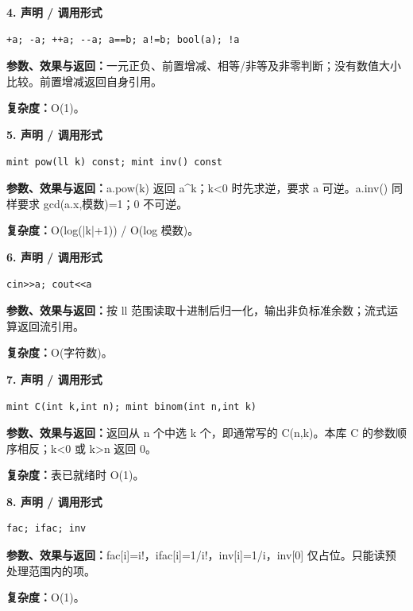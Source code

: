 \documentclass[UTF8,a4paper,10pt]{ctexart}
\begin{document}
\noindent\begin{minipage}{\textwidth}
\textbf{4. 声明 / 调用形式}
\begin{lstlisting}
+a; -a; ++a; --a; a==b; a!=b; bool(a); !a
\end{lstlisting}
\textbf{参数、效果与返回：}一元正负、前置增减、相等/非等及非零判断；没有数值大小比较。前置增减返回自身引用。

\textbf{复杂度：}O(1)。

\end{minipage}\par\vspace{0.4em}
\noindent\begin{minipage}{\textwidth}
\textbf{5. 声明 / 调用形式}
\begin{lstlisting}
mint pow(ll k) const; mint inv() const
\end{lstlisting}
\textbf{参数、效果与返回：}a.pow(k) 返回 a\textasciicircum{}k；k<0 时先求逆，要求 a 可逆。a.inv() 同样要求 gcd(a.x,模数)=1；0 不可逆。

\textbf{复杂度：}O(log(|k|+1)) / O(log 模数)。

\end{minipage}\par\vspace{0.4em}
\noindent\begin{minipage}{\textwidth}
\textbf{6. 声明 / 调用形式}
\begin{lstlisting}
cin>>a; cout<<a
\end{lstlisting}
\textbf{参数、效果与返回：}按 ll 范围读取十进制后归一化，输出非负标准余数；流式运算返回流引用。

\textbf{复杂度：}O(字符数)。

\end{minipage}\par\vspace{0.4em}
\noindent\begin{minipage}{\textwidth}
\textbf{7. 声明 / 调用形式}
\begin{lstlisting}
mint C(int k,int n); mint binom(int n,int k)
\end{lstlisting}
\textbf{参数、效果与返回：}返回从 n 个中选 k 个，即通常写的 C(n,k)。本库 C 的参数顺序相反；k<0 或 k>n 返回 0。

\textbf{复杂度：}表已就绪时 O(1)。

\end{minipage}\par\vspace{0.4em}
\noindent\begin{minipage}{\textwidth}
\textbf{8. 声明 / 调用形式}
\begin{lstlisting}
fac; ifac; inv
\end{lstlisting}
\textbf{参数、效果与返回：}fac[i]=i!，ifac[i]=1/i!，inv[i]=1/i，inv[0] 仅占位。只能读预处理范围内的项。

\textbf{复杂度：}O(1)。

\end{minipage}\par\vspace{0.4em}
\end{document}
